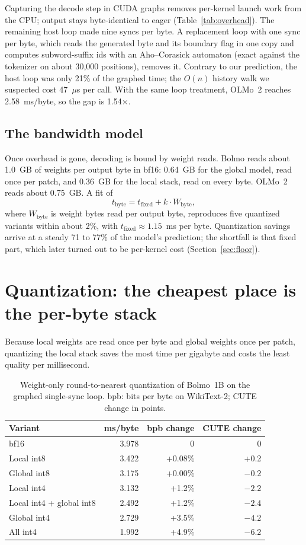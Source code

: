 \documentclass[11pt,a4paper]{article}
\newcommand{\x}{\ensuremath{\times}}
\begin{document}
Capturing the decode step in CUDA graphs removes per-kernel launch work from the CPU; output stays byte-identical to eager (Table~\ref{tab:overhead}). The remaining host loop made nine syncs per byte. A replacement loop with one sync per byte, which reads the generated byte and its boundary flag in one copy and computes subword-suffix ids with an Aho--Corasick automaton (exact against the tokenizer on about 30{,}000 positions), removes it. Contrary to our prediction, the host loop was only 21\% of the graphed time; the $O(n)$ history walk we suspected cost 47~$\mu$s per call. With the same loop treatment, OLMo~2 reaches 2.58~ms/byte, so the gap is 1.54\x.

\subsection{The bandwidth model}

Once overhead is gone, decoding is bound by weight reads. Bolmo reads about 1.0~GB of weights per output byte in bf16: 0.64~GB for the global model, read once per patch, and 0.36~GB for the local stack, read on every byte. OLMo~2 reads about 0.75~GB. A fit of
\begin{equation}
  t_{\text{byte}} = t_{\text{fixed}} + k \cdot W_{\text{byte}},
\end{equation}
where $W_{\text{byte}}$ is weight bytes read per output byte, reproduces five quantized variants within about 2\%, with $t_{\text{fixed}} \approx 1.15$~ms per byte. Quantization savings arrive at a steady 71 to 77\% of the model's prediction; the shortfall is that fixed part, which later turned out to be per-kernel cost (Section~\ref{sec:floor}).

\section{Quantization: the cheapest place is the per-byte stack}

Because local weights are read once per byte and global weights once per patch, quantizing the local stack saves the most time per gigabyte and costs the least quality per millisecond.

\begin{table}[htbp]
\centering
\caption{Weight-only round-to-nearest quantization of Bolmo~1B on the graphed single-sync loop. bpb: bits per byte on WikiText-2; CUTE change in points.}
\label{tab:quant}
\begin{tabular}{lrrr}
\toprule
Variant & ms/byte & bpb change & CUTE change \\
\midrule
bf16 & 3.978 & 0 & 0 \\
Local int8 & 3.422 & +0.08\% & +0.2 \\
Global int8 & 3.175 & +0.00\% & $-0.2$ \\
Local int4 & 3.132 & +1.2\% & $-2.2$ \\
Local int4 + global int8 & 2.492 & +1.2\% & $-2.4$ \\
Global int4 & 2.729 & +3.5\% & $-4.2$ \\
All int4 & 1.992 & +4.9\% & $-6.2$ \\
\bottomrule
\end{tabular}
\end{table}
\end{document}
